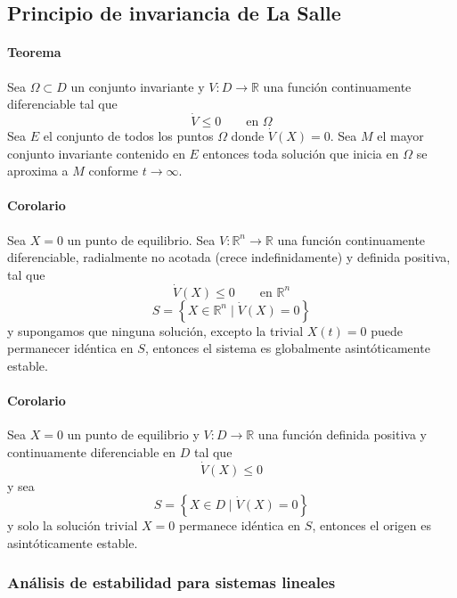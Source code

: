 \begin{flushright}
\end{flushright}

\subsection{Principio de invariancia de La Salle}

\paragraph{Teorema}
Sea $\Omega\subset D$ un conjunto invariante y
$V\colon D\to\mathbb{R}$ una función continuamente diferenciable tal que
\[
  \dot{V}\leq 0 \qquad \text{en }\Omega
\]
Sea $E$ el conjunto de todos los puntos $\Omega$ donde $\dot{V}(X)=0$. Sea
$M$ el mayor conjunto invariante contenido en $E$ entonces toda solución que
inicia en $\Omega$ se aproxima a $M$ conforme $t\to\infty$.

\paragraph{Corolario}
Sea $X=0$ un punto de equilibrio. Sea
$V\colon\mathbb{R}^{n}\to\mathbb{R}$ una función continuamente diferenciable,
radialmente no acotada (crece indefinidamente) y definida positiva, tal que
\[
  \dot{V}(X)\leq 0 \qquad \text{en }\mathbb{R}^{n}
\]
\[
  S=\left\{X\in\mathbb{R}^{n}\mid \dot{V}(X)=0\right\}
\]
y supongamos que ninguna solución, excepto la trivial $X(t)=0$ puede
permanecer idéntica en $S$, entonces el sistema es globalmente
asintóticamente estable.

\paragraph{Corolario}
Sea $X=0$ un punto de equilibrio y $V\colon D\to\mathbb{R}$ una función
definida positiva y continuamente diferenciable en $D$ tal que
\[
  \dot{V}(X)\leq 0
\]
y sea
\[
  S=\left\{X\in D\mid \dot{V}(X)=0\right\}
\]
y solo la solución trivial $X=0$ permanece idéntica en $S$, entonces el
origen es asintóticamente estable.

\subsubsection{Análisis de estabilidad para sistemas lineales}

